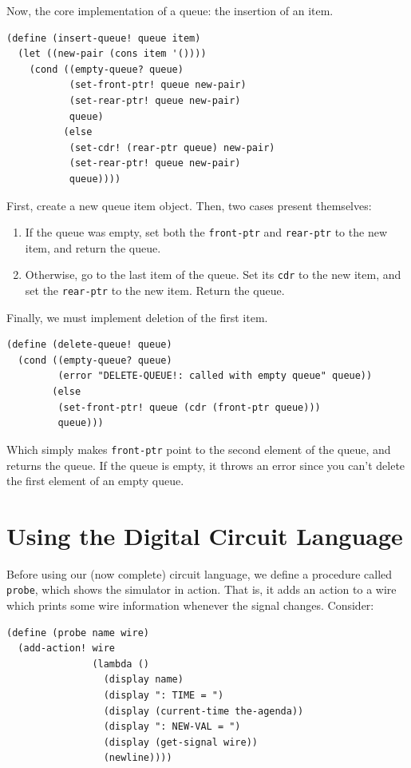 \documentclass[9pt]{report}
\begin{document}
Now, the core implementation of a queue: the insertion of an item.

\begin{verbatim}
(define (insert-queue! queue item)
  (let ((new-pair (cons item '())))
    (cond ((empty-queue? queue)
           (set-front-ptr! queue new-pair)
           (set-rear-ptr! queue new-pair)
           queue)
          (else
           (set-cdr! (rear-ptr queue) new-pair)
           (set-rear-ptr! queue new-pair)
           queue))))
\end{verbatim}

First, create a new queue item object. Then, two cases present themselves:
\begin{enumerate}
\item If the queue was empty, set both the \texttt{front-ptr} and \texttt{rear-ptr}
to the new item, and return the queue.
\item Otherwise, go to the last item of the queue. Set its \texttt{cdr} to
the new item, and set the \texttt{rear-ptr} to the new item. Return the
queue.
\end{enumerate}


Finally, we must implement deletion of the first item.

\begin{verbatim}
(define (delete-queue! queue)
  (cond ((empty-queue? queue)
         (error "DELETE-QUEUE!: called with empty queue" queue))
        (else
         (set-front-ptr! queue (cdr (front-ptr queue)))
         queue)))
\end{verbatim}

Which simply makes \texttt{front-ptr} point to the second element of the
queue, and returns the queue. If the queue is empty, it throws an
error since you can't delete the first element of an empty queue.

\section{Using the Digital Circuit Language}
\label{sec:org96f020a}

Before using our (now complete) circuit language, we define a
procedure called \texttt{probe}, which shows the simulator in action. That
is, it adds an action to a wire which prints some wire information
whenever the signal changes. Consider:

\begin{verbatim}
(define (probe name wire)
  (add-action! wire
               (lambda ()
                 (display name)
                 (display ": TIME = ")
                 (display (current-time the-agenda))
                 (display ": NEW-VAL = ")
                 (display (get-signal wire))
                 (newline))))
\end{verbatim}
\end{document}
